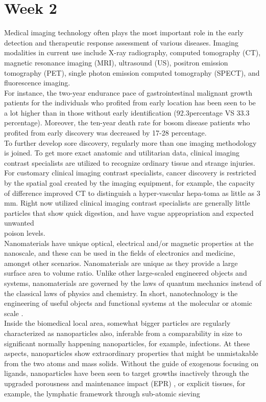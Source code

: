 \documentclass{article}
\begin{document}
\section*{Week 2}
Medical imaging technology often plays the most important role in the early detection and therapeutic response assessment of various diseases. Imaging modalities in current use include X-ray radiography, computed tomography (CT), magnetic resonance imaging (MRI), ultrasound (US), positron emission tomography (PET), single photon emission computed tomography (SPECT), and fluorescence imaging.\\ For instance, the two-year endurance pace of gastrointestinal malignant growth patients for the individuals who profited from early location has been seen to be a lot higher than in those without early identification (92.3percentage VS 33.3 percentage). Moreover, the ten-year death rate for bosom disease patients who profited from early discovery was decreased by 17-28 percentage.\\
To further develop sore discovery, regularly more than one imaging methodology is joined. To get more exact anatomic and utilitarian data, clinical imaging contrast specialists are utilized to recognize ordinary tissue and strange injuries. For customary clinical imaging contrast specialists, cancer discovery is restricted by the spatial goal created by the imaging equipment, for example, the capacity of difference improved CT to distinguish a hyper-vascular hepa-toma as little as 3 mm. Right now utilized clinical imaging contrast specialists are generally little particles that show quick digestion, and have vague appropriation and expected unwanted \\poison levels.
\\Nanomaterials have unique optical, electrical and/or magnetic properties at the nanoscale, and these can be used in the fields of electronics and medicine, amongst other scenarios. Nanomaterials are unique as they provide a large surface area to volume ratio. Unlike other large-scaled engineered objects and systems, nanomaterials are governed by the laws of quantum mechanics instead of the classical laws of physics and chemistry. In short, nanotechnology is the engineering of useful objects and functional systems at the molecular or atomic scale .
\\Inside the biomedical local area, somewhat bigger particles are regularly characterized as nanoparticles also, inferable from a comparability in size to significant normally happening nanoparticles, for example, infections. At these aspects, nanoparticles show extraordinary properties that might be unmistakable from the two atoms and mass solids. Without the guide of exogenous focusing on ligands, nanoparticles have been seen to target growths inactively through the upgraded porousness and maintenance impact (EPR) , or explicit tissues, for example, the lymphatic framework through sub-atomic sieving


 
  
\end{document}
